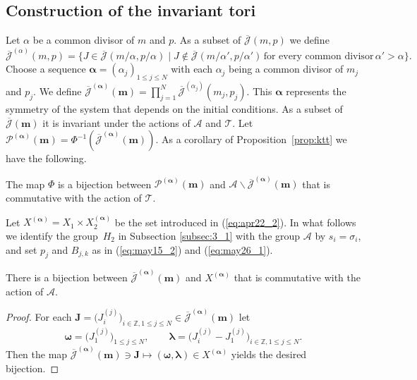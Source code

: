 \documentclass[pdftex]{sigma}
\newcommand{\Z}{{\mathbb Z}}
\newcommand{\J}{{\mathcal J}}
\newcommand{\Jb}{{\overline{\mathcal J}}}
\newcommand\bom{\boldsymbol{\omega}}
\newcommand\bol{\boldsymbol{\lambda}}
\newcommand\boa{\boldsymbol{\alpha}}
\newcommand{\m}{{\boldsymbol m}}
\newcommand{\boJ}{{\boldsymbol J}}
\begin{document}
\subsection{Construction of the invariant tori}\label{subsec:4_4}
Let $\alpha$ be a common divisor of $m$ and $p$.
As a subset of $\Jb (m,p)$ %
we def\/ine
\begin{displaymath}
{\Jb}^{(\alpha)} (m,p) = \{
J \in {\Jb} (m/\alpha,p/\alpha) \mid
J \notin {\Jb} (m/\alpha',p/\alpha') \, \mbox{for every common divisor} \, \alpha' > \alpha \}.
\end{displaymath}
Choose a sequence $\boa = (\alpha_j)_{1 \leq j \leq N}$ with
each $\alpha_j$ being a common divisor of $m_j$ and $p_j$.
We def\/ine
$\Jb^{(\boa)} (\m) = \prod_{j=1}^N {\Jb}^{(\alpha_j)} (m_j,p_j)$.
%
This $\boa$ represents the symmetry of the system that depends on the initial conditions.
%
As a subset of $\Jb (\m)$ it is invariant under the actions of ${\mathcal A}$ and ${\mathcal T}$.
{Let
${\mathcal P}^{(\boa)}(\m) = \Phi^{-1}(\Jb^{(\boa)} (\m))$.}
As a corollary of Proposition~\ref{prop:ktt} we have the following.
\begin{corollary}\label{coro:ktt}
The map $\Phi$ is a bijection
between ${\mathcal P}^{(\boa)}(\m)$ and ${\mathcal A} \backslash
\Jb^{(\boa)} (\m)$
that is commutative with the action of ${\mathcal T}$.
\end{corollary}

Let $X^{(\boa)} = X_1 \times X_2^{(\boa)}$  be the set introduced in (\ref{eq:apr22_2}).
In what follows
we identify the group~$H_2$ in Subsection \ref{subsec:3_1} with the group ${\mathcal A}$ by $s_i = \sigma_i$,
and set $p_j$ and $B_{j,k}$ as in (\ref{eq:may15_2}) and (\ref{eq:may26_1}).

\begin{lemma}\label{lem:may14_1}
There is a bijection between $\Jb^{(\boa)} (\m)$ and $X^{(\boa)}$ that is commutative with the action of ${\mathcal A}$.
\end{lemma}

\begin{proof}
For each {$\boJ = \big(J^{(j)}_i\big)_{i \in \Z, 1 \leq j \leq N} \in \Jb^{(\boa)} (\m)$}
let
\begin{displaymath}
\bom = \big(J^{(j)}_1\big)_{1 \leq j \leq N}, \qquad \bol = \big(J^{(j)}_i-J^{(j)}_1\big)_{i \in \Z, 1 \leq j \leq N}.
\end{displaymath}
Then the map $\Jb^{(\boa)} (\m) \ni \boJ \mapsto (\bom, \bol) \in X^{(\boa)}$ yields the desired bijection.
\end{proof}
\end{document}
